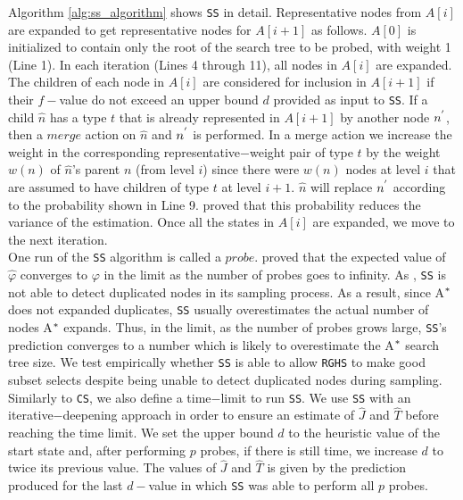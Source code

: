 Algorithm \ref{alg:ss_algorithm} shows \texttt{SS} in detail. Representative nodes from $A[i]$ are expanded to get representative nodes for $A[i+1]$ as follows. $A[0]$ is initialized to contain only the root of the search tree to be probed, with weight 1 (Line 1). In each iteration (Lines 4 through 11), all nodes in $A[i]$ are expanded. The children of each node in $A[i]$ are considered for inclusion in $A[i+1]$ if their $f-$value do not exceed an upper bound $d$ provided as input to \texttt{SS}. If a child $\hat{n}$ has a type $t$ that is already represented in $A[i+1]$ by another node $n\sp{'}$, then a $merge$ action on $\hat{n}$ and $n\sp{'}$ is performed. In a merge action we increase the weight in the corresponding representative$-$weight pair of type $t$ by the weight $w(n)$ of $\hat{n}$'s parent $n$ (from level $i$) since there were $w(n)$ nodes at level $i$ that are assumed to have children of type $t$ at level $i+1$. $\hat{n}$ will replace $n\sp{'}$ according to the probability shown in Line 9. \cite{chen1992heuristic} proved that this probability reduces the variance of the estimation. Once all the states in $A[i]$ are expanded, we move to the next iteration.\\

One run of the \texttt{SS} algorithm is called a $probe$. \cite{chen1992heuristic} proved that the expected value of $\hat{\varphi}$ converges to $\varphi$ in the limit as the number of probes goes to infinity. As \cite{lelis2014estimating}, \texttt{SS} is not able to detect duplicated nodes in its sampling process. As a result, since A$\sp{*}$ does not expanded duplicates, \texttt{SS} usually overestimates the actual number of nodes A$\sp{*}$ expands. Thus, in the limit, as the number of probes grows large, \texttt{SS}'s prediction converges to a number which  is likely to overestimate the A$\sp{*}$ search tree size. We test empirically whether \texttt{SS} is able to allow \texttt{RGHS} to make good subset selects despite being unable to detect duplicated nodes during sampling.\\

Similarly to \texttt{CS}, we also define a time$-$limit to run \texttt{SS}. We use \texttt{SS} with an iterative$-$deepening approach in order to ensure an estimate of $\hat{J}$ and $\hat{T}$ before reaching the time limit. We set the upper bound $d$ to the heuristic value of the start state and, after performing $p$ probes, if there is still time, we increase $d$ to twice its previous value. The values of $\hat{J}$ and $\hat{T}$ is given by the prediction produced for the last $d-$value in which \texttt{SS} was able to perform all $p$ probes.\\

